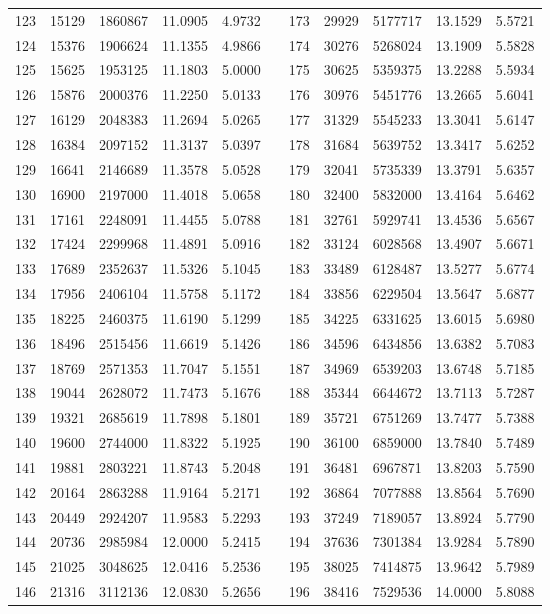 \begin{longtable}{rrrrrrrrrrr}
123&15129&1860867&11.0905&4.9732&&173&29929&5177717&13.1529&5.5721\\
124&15376&1906624&11.1355&4.9866&&174&30276&5268024&13.1909&5.5828\\
125&15625&1953125&11.1803&5.0000&&175&30625&5359375&13.2288&5.5934\\
126&15876&2000376&11.2250&5.0133&&176&30976&5451776&13.2665&5.6041\\
127&16129&2048383&11.2694&5.0265&&177&31329&5545233&13.3041&5.6147\\
128&16384&2097152&11.3137&5.0397&&178&31684&5639752&13.3417&5.6252\\
129&16641&2146689&11.3578&5.0528&&179&32041&5735339&13.3791&5.6357\\
130&16900&2197000&11.4018&5.0658&&180&32400&5832000&13.4164&5.6462\\
131&17161&2248091&11.4455&5.0788&&181&32761&5929741&13.4536&5.6567\\
132&17424&2299968&11.4891&5.0916&&182&33124&6028568&13.4907&5.6671\\
133&17689&2352637&11.5326&5.1045&&183&33489&6128487&13.5277&5.6774\\
134&17956&2406104&11.5758&5.1172&&184&33856&6229504&13.5647&5.6877\\
135&18225&2460375&11.6190&5.1299&&185&34225&6331625&13.6015&5.6980\\
136&18496&2515456&11.6619&5.1426&&186&34596&6434856&13.6382&5.7083\\
137&18769&2571353&11.7047&5.1551&&187&34969&6539203&13.6748&5.7185\\
138&19044&2628072&11.7473&5.1676&&188&35344&6644672&13.7113&5.7287\\
139&19321&2685619&11.7898&5.1801&&189&35721&6751269&13.7477&5.7388\\
140&19600&2744000&11.8322&5.1925&&190&36100&6859000&13.7840&5.7489\\
141&19881&2803221&11.8743&5.2048&&191&36481&6967871&13.8203&5.7590\\
142&20164&2863288&11.9164&5.2171&&192&36864&7077888&13.8564&5.7690\\
143&20449&2924207&11.9583&5.2293&&193&37249&7189057&13.8924&5.7790\\
144&20736&2985984&12.0000&5.2415&&194&37636&7301384&13.9284&5.7890\\
145&21025&3048625&12.0416&5.2536&&195&38025&7414875&13.9642&5.7989\\
146&21316&3112136&12.0830&5.2656&&196&38416&7529536&14.0000&5.8088\\

\end{longtable}
